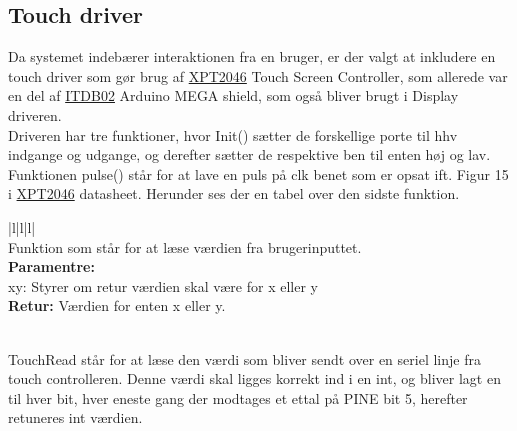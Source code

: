 \subsection{Touch driver}
Da systemet indebærer interaktionen fra en bruger, er der valgt at inkludere en touch driver som gør brug af \href{https://blackboard.au.dk/bbcswebdav/pid-1762166-dt-content-rid-4251461_1/courses/BB-Cou-UUVA-73302/BB-Cou-UUVA-65758_ImportedContent_20170106021228/BB-Cou-STADS-UUVA-52360_ImportedContent_20160107025559/LAB/LAB10%20Touch%20Screen%20Driver/Files%20for%20LAB10/XPT2046.pdf}{XPT2046}
Touch Screen Controller, som allerede var en del af \href{https://blackboard.au.dk/bbcswebdav/pid-1762173-dt-content-rid-4251448_1/courses/BB-Cou-UUVA-73302/BB-Cou-UUVA-65758_ImportedContent_20170106021228/BB-Cou-STADS-UUVA-52360_ImportedContent_20160107025559/LAB/LAB10%20Touch%20Screen%20Driver/Files%20for%20LAB10/DS_IM120417024_ITDB02ArduinoMEGAShield.pdf}{ITDB02}
Arduino MEGA shield, som også bliver brugt i Display driveren. \\
Driveren har tre funktioner, hvor Init() sætter de forskellige porte til hhv indgange og udgange, og derefter sætter de respektive ben til enten høj og lav. Funktionen pulse() står for at lave en puls på clk benet som er opsat ift. Figur 15 i \href{https://blackboard.au.dk/bbcswebdav/pid-1762166-dt-content-rid-4251461_1/courses/BB-Cou-UUVA-73302/BB-Cou-UUVA-65758_ImportedContent_20170106021228/BB-Cou-STADS-UUVA-52360_ImportedContent_20160107025559/LAB/LAB10%20Touch%20Screen%20Driver/Files%20for%20LAB10/XPT2046.pdf}{XPT2046}
datasheet. 
Herunder ses der en tabel over den sidste funktion. 

\begin{center}
\begin{tabular}{ |l|l|l| }
\hline
{} \\
\hline
Funktion som står for at læse værdien fra brugerinputtet.\\
\hline
\textbf{Paramentre:}  \\ xy: Styrer om retur værdien skal være for x eller y \\
\textbf{Retur:} Værdien for enten x eller y. \\
\\

\hline
\end{tabular}
\end{center}  

TouchRead står for at læse den værdi som bliver sendt over en seriel linje fra touch controlleren. Denne værdi skal ligges korrekt ind i en int, og bliver lagt en til hver bit, hver eneste gang der modtages et ettal på PINE bit 5, herefter retuneres int værdien. 


